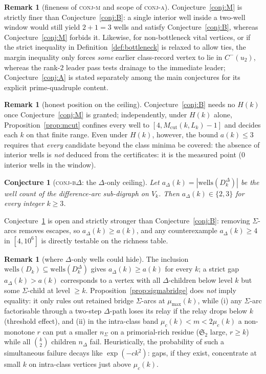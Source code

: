 \documentclass[11pt]{article}
\theoremstyle{plain}
\newtheorem{conjecture}[theorem]{Conjecture}
\theoremstyle{definition}
\newtheorem{remark}[theorem]{Remark}
\newcommand{\rch}{r}
\newcommand{\Vk}{V_{k}}
\newcommand{\Dk}{D_{k}}
\newcommand{\DkD}{D_{k}^{\Delta}}
\newcommand{\Mcut}{M_{\mathrm{cut}}}
\newcommand{\wells}{\mathrm{wells}}
\begin{document}
\begin{remark}[fineness of \textsc{conj-m} and scope of \textsc{conj-a}]
\label{rem:posA}
Conjecture~\ref{conj:M} is strictly finer than
Conjecture~\ref{conj:B}: a single interior well inside a two-well
window would still yield $2 + 1 = 3$ wells and satisfy
Conjecture~\ref{conj:B}, whereas Conjecture~\ref{conj:M} forbids it.
Likewise, for non-bottleneck vital vertices, or if the strict inequality in
Definition~\ref{def:bottleneck} is relaxed to allow ties, the
margin inequality only forces \emph{some} earlier class-record
vertex to lie in $C^{-}(u_2)$, whereas the rank-$2$ leader pass
tests drainage to the immediate leader; Conjecture~\ref{conj:A} is
stated separately among the main conjectures for its explicit
prime-quadruple content.
\end{remark}

\begin{remark}[honest position on the ceiling]
Conjecture~\ref{conj:B} needs no $H(k)$ once Conjecture~\ref{conj:M}
is granted; independently, under $H(k)$ alone,
Proposition~\ref{prop:mcut} confines every well to
$[4, \Mcut(k,L_k) - 1]$ and decides each $k$ on that finite range.
Even under $H(k)$, however, the bound $a(k) \le 3$ requires that
\emph{every} candidate beyond the class minima be covered: the
absence of interior wells is \emph{not} deduced from the
certificates: it is the measured point ($0$ interior wells in the
window).
\end{remark}

\begin{conjecture}[\textsc{conj-b}$\Delta$: the $\Delta$-only ceiling]
\label{conj:Bdelta}
Let $a_\Delta(k) = |\wells(\DkD)|$ be the well count of the
difference-arc sub-digraph on $\Vk$. Then $a_\Delta(k) \in \{2,3\}$
for every integer $k \ge 3$.
\end{conjecture}

Conjecture~\ref{conj:Bdelta} is open and strictly stronger than
Conjecture~\ref{conj:B}: removing $\Sigma$-arcs removes escapes, so
$a_\Delta(k) \ge a(k)$, and any counterexample $a_\Delta(k) \ge 4$
in $[4,10^6]$ is directly testable on the richness table.

\begin{remark}[where $\Delta$-only wells could hide]
\label{rem:deltagap}
The inclusion $\wells(\Dk) \subseteq \wells(\DkD)$ gives
$a_\Delta(k) \ge a(k)$ for every $k$; a strict gap
$a_\Delta(k) > a(k)$ corresponds to a vertex with all
$\Delta$-children below level $k$ but some $\Sigma$-child at level
$\ge k$. Proposition~\ref{prop:sigmabridge} does \emph{not} imply
equality: it only rules out retained bridge $\Sigma$-arcs at
$\mu_{\max}(k)$, while (i) any $\Sigma$-arc factorisable through a
two-step $\Delta$-path loses its relay if the relay drops below $k$
(threshold effect), and (ii) in the intra-class band
$\mu_c(k) < m < 2 \mu_c(k)$ a non-monotone $\rch$ can put a smaller
$n_\Sigma$ on a primorial-rich residue ($\mathfrak{S}_2$ large,
$\rch \ge k$) while all $\binom{k}{2}$ children $n_\Delta$ fail.
Heuristically, the probability of such a simultaneous failure decays
like $\exp(-c k^{2})$: gaps, if they exist, concentrate at small $k$
on intra-class vertices just above $\mu_c(k)$.
\end{remark}
\end{document}
